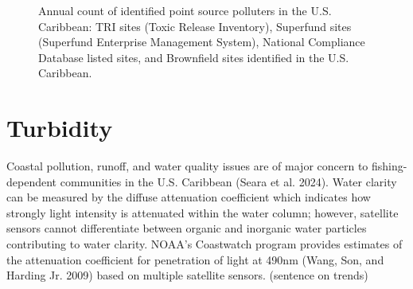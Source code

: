 \documentclass[
  letterpaper,
  oneside,
  open=any]{scrbook}
\begin{document}
\begin{figure}


\caption{\label{fig-pollution}Annual count of identified point source
polluters in the U.S. Caribbean: TRI sites (Toxic Release Inventory),
Superfund sites (Superfund Enterprise Management System), National
Compliance Database listed sites, and Brownfield sites identified in the
U.S. Caribbean.}

\end{figure}%

\section{Turbidity}\label{turbidity}

Coastal pollution, runoff, and water quality issues are of major concern
to fishing-dependent communities in the U.S. Caribbean (Seara et al.
2024). Water clarity can be measured by the diffuse attenuation
coefficient which indicates how strongly light intensity is attenuated
within the water column; however, satellite sensors cannot differentiate
between organic and inorganic water particles contributing to water
clarity. NOAA's Coastwatch program provides estimates of the attenuation
coefficient for penetration of light at 490nm (Wang, Son, and Harding
Jr. 2009) based on multiple satellite sensors. (sentence on trends)
\end{document}
